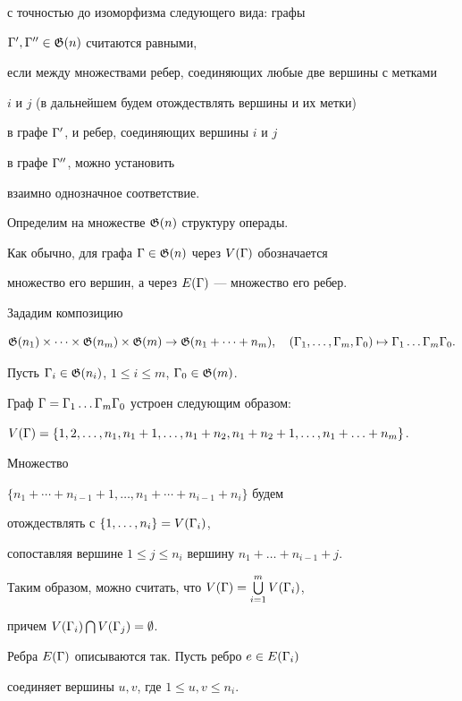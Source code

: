 с точностью до изоморфизма следующего вида: графы


${\Gamma} ', {\Gamma} ''\in{\frak G} (n)$ считаются равными, 


если между множествами ребер, соединяющих любые две вершины с метками 


$i$ и $j$ (в дальнейшем будем отождествлять вершины и их метки) 


в графе ${\Gamma} '$, и ребер, соединяющих вершины $i$ и $j$ 


в графе ${\Gamma} ''$, можно установить 


взаимно однозначное соответствие. 





Определим на множестве ${\frak G} (n)$ структуру операды.


Как обычно, для графа ${\Gamma} \in{\frak G} (n)$ через $ V({\Gamma} )$ обозначается


множество его вершин, а через $E({\Gamma} )$ --- множество его ребер.


Зададим композицию


$$


\J(n_1)\times \dotsb \times \J(n_m)\times\J(m)\rightarrow \J(n_1+\dotsb+n_m),


\quad (\G_1,\dotsc,\G_m,\G_0)\mapsto \G_1\dotsc\G_m\G_0.


$$


Пусть ${\Gamma}_i\in{\frak G}(n_i)$, $1\leq i\leq m$, ${\Gamma}_0\in{\frak G}(m)$.


Граф ${\Gamma}={\Gamma}_1\dotsc {\Gamma}_m{\Gamma}_0$ устроен следующим образом:


$V(\G)=\{ 1, 2, \dotsc , n_1, n_1+1, \dotsc , n_1+n_2, n_1+n_2+1, \dotsc ,


n_1+\dotsc +n_m\}$.


Множество


$\{ n_1+\dotsb +n_{i-1}+1, \dotsc , n_1+\dotsb +n_{i-1}+n_i \}$ будем 


отождествлять с $\{ 1, \dotsc , n_i \} =V({\Gamma}_i)$,


сопоставляя вершине $1\leq j\leq n_i$ вершину $n_1+\dotsc +n_{i-1}+j$.


Таким образом, можно считать, что $V({\Gamma})=\bigcup\limits_{i=1}^m V({\Gamma}_i)$,


причем $V({\Gamma}_i)\bigcap V({\Gamma}_j)=\emptyset$. 





Ребра $E({\Gamma})$ описываются так. Пусть ребро $e\in E({\Gamma}_i)$ 


соединяет вершины $u, v$, где $1\leq u, v\leq n_i$.


